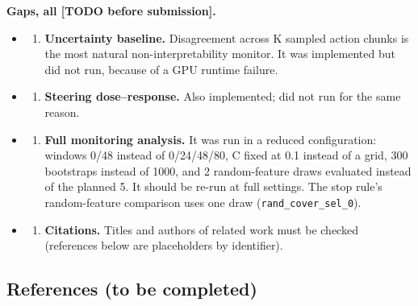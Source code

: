 \documentclass[
  10pt,
]{article}
\providecommand{\tightlist}{%
  \setlength{\itemsep}{0pt}\setlength{\parskip}{0pt}}
\begin{document}
\textbf{Gaps, all {[}TODO before submission{]}.}

\begin{itemize}
\item
  \begin{enumerate}
  \def\labelenumi{(\roman{enumi})}
  \tightlist
  \item
    \textbf{Uncertainty baseline.} Disagreement across K sampled action
    chunks is the most natural non-interpretability monitor. It was
    implemented but did not run, because of a GPU runtime failure.
  \end{enumerate}
\item
  \begin{enumerate}
  \def\labelenumi{(\roman{enumi})}
  \setcounter{enumi}{1}
  \tightlist
  \item
    \textbf{Steering dose--response.} Also implemented; did not run for
    the same reason.
  \end{enumerate}
\item
  \begin{enumerate}
  \def\labelenumi{(\roman{enumi})}
  \setcounter{enumi}{2}
  \tightlist
  \item
    \textbf{Full monitoring analysis.} It was run in a reduced
    configuration: windows 0/48 instead of 0/24/48/80, C fixed at 0.1
    instead of a grid, 300 bootstraps instead of 1000, and 2
    random-feature draws evaluated instead of the planned 5. It should
    be re-run at full settings. The stop rule's random-feature
    comparison uses one draw (\texttt{rand\_cover\_sel\_0}).
  \end{enumerate}
\item
  \begin{enumerate}
  \def\labelenumi{(\roman{enumi})}
  \setcounter{enumi}{3}
  \tightlist
  \item
    \textbf{Citations.} Titles and authors of related work must be
    checked (references below are placeholders by identifier).
  \end{enumerate}
\end{itemize}

\hypertarget{references-to-be-completed}{%
\subsection{References (to be
completed)}\label{references-to-be-completed}}
\end{document}
